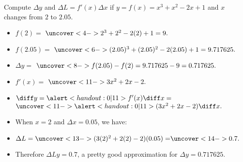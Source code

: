 \begin{frame}
\begin{example}%
Compute $\Delta y$ and $\Delta L= f'(x) \Delta x$ if $y = f(x) = x^3 + x^2 - 2x + 1$ and $x$ changes from $2$ to $2.05$.
\begin{itemize}
\item<2-| alert@3-4>  $f(2) =$ $\uncover<4->{2^3+2^2-2(2)+1 = 9.}$
\item<2-| alert@5-6>  $f(2.05) =$ $\uncover<6->{(2.05)^3+(2.05)^2-2(2.05)+1 = 9.717625.}$
\item<2-| alert@7-8>  $\Delta y =$ $\uncover<8->{f(2.05) - f(2) = 9.717625 - 9 = 0.717625.}$
\item<9-| alert@10-11>  $f'(x) = $ $\uncover<11->{3x^2 + 2x -2.}$
\item<9->  $\diff y = \alert<handout:0| 11>{f'(x)}\diff x = $ $\uncover<11->{\alert<handout:0| 11>{(3x^2+2x-2)}\diff x.}$
\item<12->  When $x = 2$ and $\Delta x = 0.05$, we have:
\item<12-| alert@13-14>  $\Delta L = \uncover<13->{(3(2)^2 + 2(2) - 2)(0.05) =} \uncover<14->{0.7.}$
\item<15->  Therefore $\Delta L y = 0.7$, a pretty good approximation for $\Delta y = 0.717625$.
\end{itemize}
\end{example}
\end{frame}
